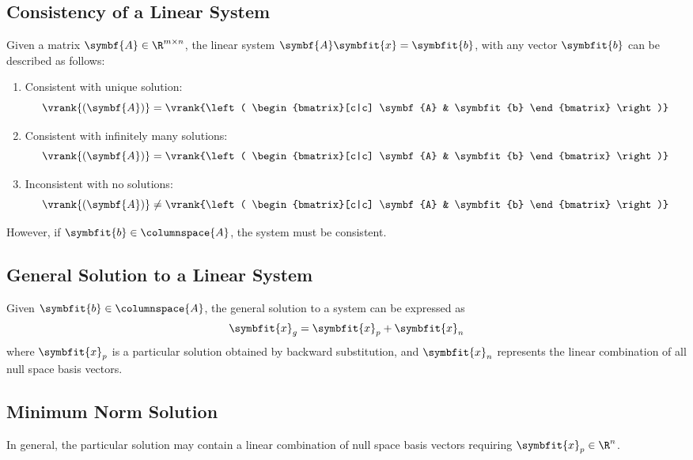 \documentclass{article}
\begin{document}
\subsection{Consistency of a Linear System}
Given a matrix \(\symbf{A} \in \R^{m \times n}\), the linear system \(\symbf{A}\symbfit{x} = \symbfit{b}\),
with any vector \(\symbfit{b}\) can be described as follows:
\begin{enumerate}
    \item Consistent with unique solution: 
    \begin{equation*}
        \vrank{\left( \symbf{A} \right)} = 
        \vrank{\left( \begin{bmatrix}[c|c] 
            \symbf{A} & \symbfit{b} 
        \end{bmatrix} \right)}
    \end{equation*}
    \item Consistent with infinitely many solutions: 
    \begin{equation*}
        \vrank{\left( \symbf{A} \right)} = 
        \vrank{\left( \begin{bmatrix}[c|c] 
            \symbf{A} & \symbfit{b} 
        \end{bmatrix} \right)}
    \end{equation*}
    \item Inconsistent with no solutions: 
    \begin{equation*}
        \vrank{\left( \symbf{A} \right)} \neq 
        \vrank{\left( \begin{bmatrix}[c|c] 
            \symbf{A} & \symbfit{b} 
        \end{bmatrix} \right)}
    \end{equation*}
\end{enumerate}
However, if \(\symbfit{b} \in \columnspace{{A}}\), the system must be consistent.
\subsection{General Solution to a Linear System}
Given \(\symbfit{b} \in \columnspace{A}\), the general solution to a system can be expressed as
\begin{equation*}
    \symbfit{x}_g = \symbfit{x}_p + \symbfit{x}_n
\end{equation*}
where \(\symbfit{x}_p\) is a particular solution obtained by backward substitution, and 
\(\symbfit{x}_n\) represents the linear combination of all null space basis vectors.
\subsection{Minimum Norm Solution}
In general, the particular solution may contain a linear combination of
null space basis vectors requiring \(\symbfit{x}_p \in \R^n\).
\end{document}
